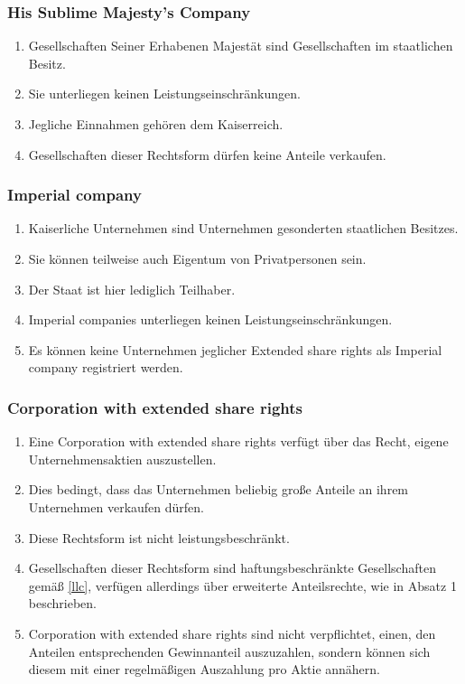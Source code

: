 \documentclass{article}
\begin{document}
\subsubsection{His Sublime Majesty's Company}
\begin{enumerate}[(1)]
    \item Gesellschaften Seiner Erhabenen Majestät sind Gesellschaften im staatlichen Besitz.
    \item Sie unterliegen keinen Leistungseinschränkungen.
    \item Jegliche Einnahmen gehören dem Kaiserreich.
    \item Gesellschaften dieser Rechtsform dürfen keine Anteile verkaufen.
\end{enumerate}

\subsubsection{Imperial company}
\begin{enumerate}[(1)]
    \item Kaiserliche Unternehmen sind Unternehmen gesonderten staatlichen Besitzes.
    \item Sie können teilweise auch Eigentum von Privatpersonen sein.
    \item Der Staat ist hier lediglich Teilhaber.
    \item Imperial companies unterliegen keinen Leistungseinschränkungen.
    \item Es können keine Unternehmen jeglicher Extended share rights als Imperial company registriert werden.
\end{enumerate}

\subsubsection{Corporation with extended share rights}\label{ext}
\begin{enumerate}[(1)]
    \item Eine Corporation with extended share rights verfügt über das Recht, eigene Unternehmensaktien auszustellen.
    \item Dies bedingt, dass das Unternehmen beliebig große Anteile an ihrem Unternehmen verkaufen dürfen.
    \item Diese Rechtsform ist nicht leistungsbeschränkt.
    \item Gesellschaften dieser Rechtsform sind haftungsbeschränkte Gesellschaften gemäß \ref{llc}, verfügen allerdings über erweiterte Anteilsrechte, wie in Absatz 1 beschrieben.
    \item Corporation with extended share rights sind nicht verpflichtet, einen, den Anteilen entsprechenden Gewinnanteil auszuzahlen, sondern können sich diesem mit einer regelmäßigen Auszahlung pro Aktie annähern.
\end{enumerate}
\end{document}
